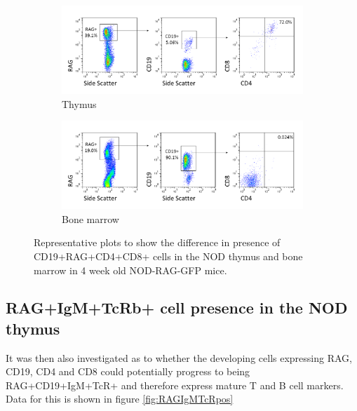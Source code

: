 \begin{figure}	
	\begin{subfigure}{\textwidth}
	\includegraphics[width=\textwidth]{Figures/Thymus1RAGCD19DP.png}
	\caption{Thymus}
	\end{subfigure}
	\begin{subfigure}{\textwidth}
	\includegraphics[width=\textwidth]{Figures/BM1RAGCD19DP.png}
	\caption{Bone marrow}
	\end{subfigure}
\caption{Representative plots to show the difference in presence of CD19+RAG+CD4+CD8+ cells in the NOD thymus and bone marrow in 4 week old NOD-RAG-GFP mice.}
\label{fig:RAGCD19CD4CD8pos}
\end{figure}




\subsection{RAG+IgM+TcRb+ cell presence in the NOD thymus}

It was then also investigated as to whether the developing cells expressing RAG, CD19, CD4 and CD8 could potentially progress to being RAG+CD19+IgM+TcR+ and therefore express mature T and B cell markers.
Data for this is shown in figure \cref{fig:RAGIgMTcRpos}

